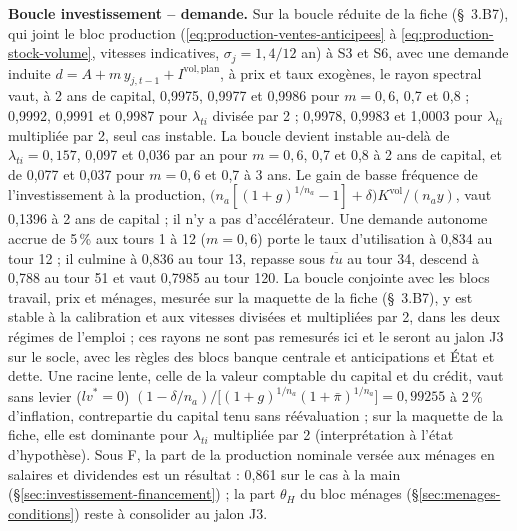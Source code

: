 \documentclass[11pt,a4paper]{article}
\begin{document}
\begin{proposee}
\textbf{Boucle investissement -- demande.} Sur la boucle réduite de la fiche (\S~3.B7), qui joint le bloc production (\eqref{eq:production-ventes-anticipees} à \eqref{eq:production-stock-volume}, vitesses indicatives, $\sigma_j = 1{,}4/12$ an) à S3 et S6, avec une demande induite $d = A + m\,y_{j,t-1} + I^{\mathrm{vol},\mathrm{plan}}$, à prix et taux exogènes, le rayon spectral vaut, à 2 ans de capital, 0,9975, 0,9977 et 0,9986 pour $m = 0{,}6$, 0,7 et 0,8 ; 0,9992, 0,9991 et 0,9987 pour $\lambda_{\mathit{ti}}$ divisée par 2 ; 0,9978, 0,9983 et 1,0003 pour $\lambda_{\mathit{ti}}$ multipliée par 2, seul cas instable. La boucle devient instable au-delà de $\lambda_{\mathit{ti}} = 0{,}157$, 0,097 et 0,036 par an pour $m = 0{,}6$, 0,7 et 0,8 à 2 ans de capital, et de 0,077 et 0,037 pour $m = 0{,}6$ et 0,7 à 3 ans. Le gain de basse fréquence de l'investissement à la production, $\bigl(n_a[(1 + g)^{1/n_a} - 1] + \delta\bigr)K^{\mathrm{vol}}/(n_a y)$, vaut 0,1396 à 2 ans de capital ; il n'y a pas d'accélérateur. Une demande autonome accrue de 5\,\% aux tours 1 à 12 ($m = 0{,}6$) porte le taux d'utilisation à 0,834 au tour 12 ; il culmine à 0,836 au tour 13, repasse sous $\overline{\mathit{tu}}$ au tour 34, descend à 0,788 au tour 51 et vaut 0,7985 au tour 120. La boucle conjointe avec les blocs travail, prix et ménages, mesurée sur la maquette de la fiche (\S~3.B7), y est stable à la calibration et aux vitesses divisées et multipliées par 2, dans les deux régimes de l'emploi ; ces rayons ne sont pas remesurés ici et le seront au jalon J3 sur le socle, avec les règles des blocs banque centrale et anticipations et État et dette. Une racine lente, celle de la valeur comptable du capital et du crédit, vaut sans levier ($\mathit{lv}^\ast = 0$) $(1 - \delta/n_a)/\bigl[(1 + g)^{1/n_a}(1 + \bar\pi)^{1/n_a}\bigr] = 0{,}99255$ à 2\,\% d'inflation, contrepartie du capital tenu sans réévaluation ; sur la maquette de la fiche, elle est dominante pour $\lambda_{\mathit{ti}}$ multipliée par 2 (interprétation à l'état d'hypothèse). Sous F, la part de la production nominale versée aux ménages en salaires et dividendes est un résultat : 0,861 sur le cas à la main (\S\ref{sec:investissement-financement}) ; la part $\theta_H$ du bloc ménages (\S\ref{sec:menages-conditions}) reste à consolider au jalon J3.


\end{proposee}
\end{document}
